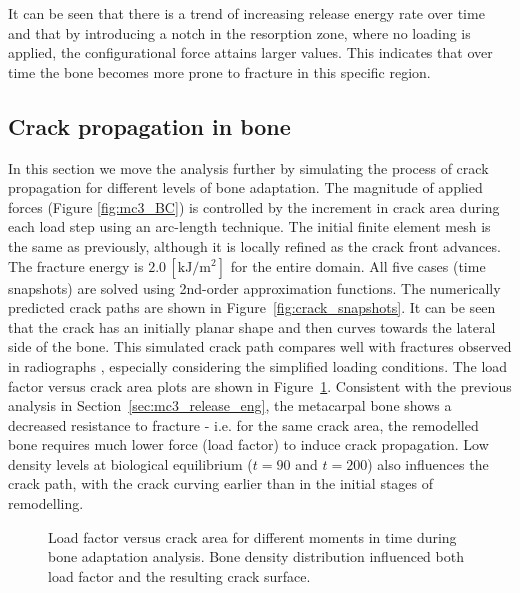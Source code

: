 \documentclass[review]{elsarticle}
\numberwithin{equation}{section}
\begin{document}
It can be seen that there is a trend of increasing release energy rate over time and that by introducing a notch in the resorption zone, where no loading is applied, the configurational force attains larger values. This indicates that over time the bone becomes more prone to fracture in this specific region. 

\subsection{Crack propagation in bone}
In this section we move the analysis further by simulating the process of crack propagation for different levels of bone adaptation. The magnitude of applied forces (Figure \ref{fig:mc3_BC}) is controlled by the increment in crack area during each load step using an arc-length technique. The initial finite element mesh is the same as previously, although it is locally refined as the crack front advances. The fracture energy is $2.0\,[\mathrm{ kJ/m^2}]$ for the entire domain. 
All five cases (time snapshots) are solved using 2nd-order approximation functions.
The numerically predicted crack paths are shown in Figure~\ref{fig:crack_snapshots}. 
It can be seen that the crack has an initially planar shape and then curves towards the lateral side of the bone. This simulated crack path compares well with fractures observed in radiographs \citep{whitton2010third}, especially considering the simplified loading conditions. The load factor versus crack area plots are shown in Figure~\ref{fig:crack_remodel_frac_compar}. Consistent with the previous analysis in Section~\ref{sec:mc3_release_eng}, the metacarpal bone shows a decreased resistance to fracture - i.e. for the same crack area, the remodelled bone requires much lower force (load factor) to induce crack propagation. Low density levels at biological equilibrium ($t=90$ and $t=200$) also influences the crack path, with the crack curving earlier than in the initial stages of remodelling. 

\begin{figure}[h!]
	\centering
	\caption{Load factor versus crack area for different moments in time during bone adaptation analysis. Bone density distribution influenced both load factor and the resulting crack surface.}
	\label{fig:crack_remodel_frac_compar}
\end{figure}
\end{document}
